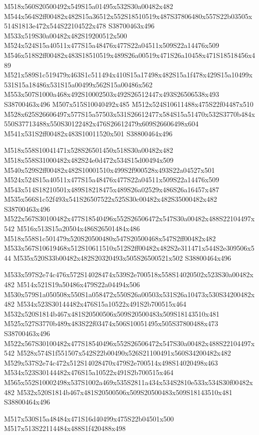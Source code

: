 \documentclass{article}
\begin{document}
\begin{multicols}{2}
M518x560S20500492x549S15a01495x532S30a00482x482 M544x564S2ff00482x482S15a36512x552S18510519x487S37806480x557S22b03505x514S1813e472x544S22104522x478 S38700463x496 M533x519S30a00482x482S19200512x500 M524x524S15a40511x477S15a48476x477S22a04511x509S22a14476x509 M546x518S2ff00482x483S18510519x489S26a00519x471S26a10458x471S18518456x489 M521x589S1c519479x463S1c511494x410S15a17498x482S15a1f478x429S15a10499x531S15a18486x531S15a00499x562S15a00486x562 M553x507S1000a468x492S10002503x492S26512447x493S26506538x493 S38700463x496 M507x515S10040492x485 M512x524S10611488x475S22f04487x510 M528x625S26606497x577S15a57503x531S26612477x584S15a51470x532S3770b484x550S37713488x550S30122482x476S26612479x609S26606498x604 M541x531S2ff00482x483S10011520x501 S38800464x496

M518x558S10041471x528S26501450x518S30a00482x482 M518x558S31000482x482S24e0d472x534S15d00494x509 M540x529S2ff00482x482S10001510x499S2f900528x493S22a04527x501 M524x524S15a40511x477S15a48476x477S22a04511x509S22a14476x509 M543x514S18210501x489S18218475x489S26a02529x486S26a16457x487 M535x566S1c52f493x541S26507522x525S30c00482x482S35000482x482 S38700463x496 M522x567S30100482x477S18540496x552S26506472x547S30a00482x488S22104497x542 M516x513S15a20504x486S26501484x486 M518x558S1c501479x520S20500480x547S20500468x547S2ff00482x482 M533x567S10619468x512S10611510x512S2ff00482x482S2e311471x544S2e309506x544 M535x520S33b00482x482S20320493x505S26500521x502 S38800464x496

M533x597S2e74c476x572S14028474x539S2e700518x558S14020502x523S30a00482x482 M514x521S19a50486x479S22a04494x506 M530x579S1a050508x550S1a058472x550S26a00503x531S26a10473x530S34200482x482 M534x523S30144482x476S15a10522x491S2b700515x464 M532x520S1814b467x481S20500506x509S20500483x509S18143510x481 M525x527S3770b489x483S22f03474x506S10051495x505S37800488x473 S38700463x496 M522x567S30100482x477S18540496x552S26506472x547S30a00482x488S22104497x542 M528x574S1f551507x542S22b00490x526S21100491x560S34200482x482 M529x537S2e74c472x512S14028470x479S2e700514x498S14020498x463 M534x523S30144482x476S15a10522x491S2b700515x464 M565x552S10002498x537S1002a469x535S2811a434x534S2810e533x534S30f00482x482 M532x520S1814b467x481S20500506x509S20500483x509S18143510x481 S38800464x496

\begin{center}
M517x530S15a48484x471S16d40499x475S22b04501x500 M517x513S22114484x488S1f420488x498 
\end{center}



\end{multicols}
\end{document}

